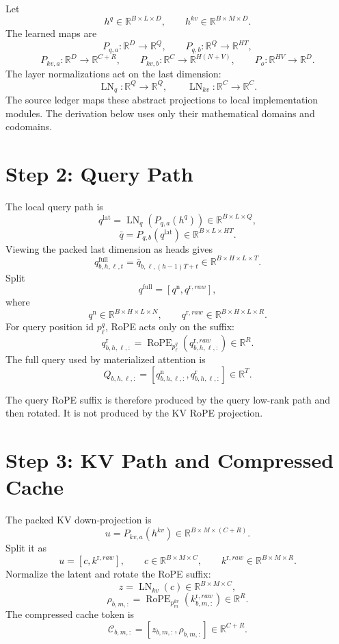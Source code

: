 \documentclass[11pt]{article}
\newcommand{\R}{\mathbb{R}}
\newcommand{\LN}{\operatorname{LN}}
\newcommand{\RoPE}{\operatorname{RoPE}}
\newcommand{\cache}{\mathcal{C}}
\begin{document}
Let
\[
  h^q\in\R^{B\times L\times D},
  \qquad
  h^{kv}\in\R^{B\times M\times D}.
\]
The learned maps are
\[
  P_{q,a}:\R^D\to\R^Q,\qquad
  P_{q,b}:\R^Q\to\R^{H T},
\]
\[
  P_{kv,a}:\R^D\to\R^{C+R},\qquad
  P_{kv,b}:\R^C\to\R^{H(N+V)},\qquad
  P_o:\R^{H V}\to\R^D.
\]
The layer normalizations act on the last dimension:
\[
  \LN_q:\R^Q\to\R^Q,\qquad
  \LN_{kv}:\R^C\to\R^C.
\]
The source ledger maps these abstract projections to local implementation
modules.  The derivation below uses only their mathematical domains and
codomains.

\section{Step 2: Query Path}

The local query path is
\[
  q^{\mathrm{lat}}=\LN_q(P_{q,a}(h^q))
  \in\R^{B\times L\times Q},
\]
\[
  \bar q=P_{q,b}(q^{\mathrm{lat}})
  \in\R^{B\times L\times H T}.
\]
Viewing the packed last dimension as heads gives
\[
  q^{\mathrm{full}}_{b,h,\ell,t}
  =
  \bar q_{b,\ell,(h-1)T+t}
  \in\R^{B\times H\times L\times T}.
\]
Split
\[
  q^{\mathrm{full}}=[q^{\mathrm n},q^{\mathrm r,raw}],
\]
where
\[
  q^{\mathrm n}\in\R^{B\times H\times L\times N},
  \qquad
  q^{\mathrm r,raw}\in\R^{B\times H\times L\times R}.
\]
For query position id $p^q_\ell$, RoPE acts only on the suffix:
\[
  q^{\mathrm r}_{b,h,\ell,:}
  =
  \RoPE_{p^q_\ell}(q^{\mathrm r,raw}_{b,h,\ell,:})
  \in\R^R.
\]
The full query used by materialized attention is
\[
  Q_{b,h,\ell,:}=[q^{\mathrm n}_{b,h,\ell,:},q^{\mathrm r}_{b,h,\ell,:}]
  \in\R^T.
\]

The query RoPE suffix is therefore produced by the query low-rank path and then
rotated.  It is not produced by the KV RoPE projection.

\section{Step 3: KV Path and Compressed Cache}

The packed KV down-projection is
\[
  u=P_{kv,a}(h^{kv})\in\R^{B\times M\times(C+R)}.
\]
Split it as
\[
  u=[c,k^{\mathrm r,raw}],
  \qquad
  c\in\R^{B\times M\times C},
  \qquad
  k^{\mathrm r,raw}\in\R^{B\times M\times R}.
\]
Normalize the latent and rotate the RoPE suffix:
\[
  z=\LN_{kv}(c)\in\R^{B\times M\times C},
\]
\[
  \rho_{b,m,:}=
  \RoPE_{p^{kv}_m}(k^{\mathrm r,raw}_{b,m,:})
  \in\R^R.
\]
The compressed cache token is
\[
  \cache_{b,m,:}=[z_{b,m,:},\rho_{b,m,:}]\in\R^{C+R}.
\]
\end{document}
